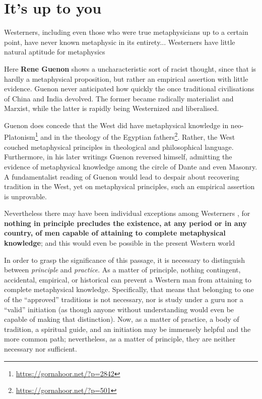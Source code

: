 \section{It’s up to you}

\begin{quotex}
Westerners, including even those who were true metaphysicians up to a certain point, have never known metaphysic in its entirety... Westerners have little natural aptitude for metaphysics
\end{quotex}


Here \textbf{Rene Guenon} shows a uncharacteristic sort of racist thought, since that is hardly a metaphysical proposition, but rather an empirical assertion with little evidence. Guenon never anticipated how quickly the once traditional civilisations of China and India devolved. The former became radically materialist and Marxist, while the latter is rapidly being Westernized and liberalised.

Guenon does concede that the West did have metaphysical knowledge in neo-Platonism\footnote{\url{https://gornahoor.net/?p=2842}} and in the theology of the Egyptian fathers\footnote{\url{https://gornahoor.net/?p=501}}. Rather, the West couched metaphysical principles in theological and philosophical language. Furthermore, in his later writings Guenon reversed himself, admitting the evidence of metaphysical knowledge among the circle of Dante and even Masonry. A fundamentalist reading of Guenon would lead to despair about recovering tradition in the West, yet on metaphysical principles, such an empirical assertion is unprovable.

\begin{quotex}
Nevertheless there may have been individual exceptions among Westerners , for \textbf{nothing in principle precludes the existence, at any period or in any country, of men capable of attaining to complete metaphysical knowledge}; and this would even be possible in the present Western world
\end{quotex}

In order to grasp the significance of this passage, it is necessary to distinguish between \emph{principle} and \emph{practice}. As a matter of principle, nothing contingent, accidental, empirical, or historical can prevent a Western man from attaining to complete metaphysical knowledge. Specifically, that means that belonging to one of the ``approved'' traditions is not necessary, nor is study under a guru nor a ``valid'' initiation (as though anyone without understanding would even be capable of making that distinction). Now, as a matter of practice, a body of tradition, a spiritual guide, and an initiation may be immensely helpful and the more common path; nevertheless, as a matter of principle, they are neither necessary nor sufficient.

